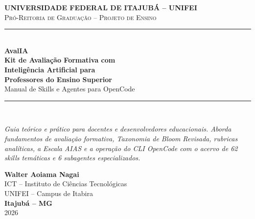 \documentclass[12pt,openright,twoside,a4paper,english,brazil]{memoir}
\begin{document}
\frontmatter

\begin{titlingpage}
  \begin{center}
    \vspace*{1.5cm}
    {\large\scshape\bfseries\color{primary} UNIVERSIDADE FEDERAL DE ITAJUB{\'A} -- UNIFEI}\\[0.3cm]
    {\small\scshape\color{secondary} Pr{\'o}-Reitoria de Gradua{\c c}{\~a}o -- Projeto de Ensino}\\[2.2cm]

    \color{boxborder}\rule{\linewidth}{2pt}\\[0.5cm]
    {\Huge\bfseries\color{primary} AvalIA}\\[0.5cm]
    {\LARGE\bfseries\color{primary} Kit de Avalia{\c c}{\~a}o Formativa com\\ Intelig{\^e}ncia Artificial para\\ Professores do Ensino Superior}\\[0.4cm]
    {\Large\color{secondary} Manual de Skills e Agentes para OpenCode}\\[0.4cm]
    \color{boxborder}\rule{\linewidth}{2pt}\\[3cm]

    \begin{minipage}{0.85\linewidth}
      \centering
      \itshape\color{neutraldark}
      Guia te{\'o}rico e pr{\'a}tico para docentes e desenvolvedores educacionais.
      Aborda fundamentos de avalia{\c c}{\~a}o formativa, Taxonomia de Bloom Revisada,
      rubricas anal{\'i}ticas, a Escala AIAS e a opera{\c c}{\~a}o do CLI OpenCode com o acervo
      de 62 skills tem{\'a}ticas e 6 subagentes especializados.
    \end{minipage}

    \vfill
    {\normalsize\bfseries\color{primary} Walter Aoiama Nagai}\\[0.15cm]
    {\small\color{secondary} ICT -- Instituto de Ci{\^e}ncias Tecnol{\'o}gicas}\\[0.1cm]
    {\small\color{secondary} UNIFEI -- Campus de Itabira}\\[0.4cm]
    {\small\bfseries\color{secondary} Itajub{\'a} -- MG}\\[0.2cm]
    {\small\color{secondary} 2026}
  \end{center}
\end{titlingpage}
\end{document}
